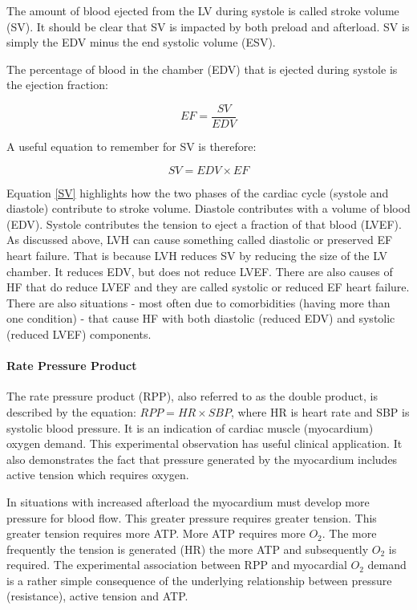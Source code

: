The amount of blood ejected from the LV during systole is called stroke volume (SV). It should be clear that SV is impacted by both preload and afterload. SV is simply the EDV minus the end systolic volume (ESV). 

The percentage of blood in the chamber (EDV) that is ejected during systole is the ejection fraction: 

\begin{equation}
    EF = \frac{SV}{EDV}
    \label{LVEF}
\end{equation}

A useful equation to remember for SV is therefore:

\begin{equation}
    SV = EDV \times EF
    \label{SV}
\end{equation}

Equation \ref{SV} highlights how the two phases of the cardiac cycle (systole and diastole) contribute to stroke volume. Diastole contributes with a volume of blood (EDV). Systole contributes the tension to eject a fraction of that blood (LVEF). As discussed above, LVH can cause something called diastolic or preserved EF heart failure. That is because LVH reduces SV by reducing the size of the LV chamber. It reduces EDV, but does not reduce LVEF. There are also causes of HF that do reduce LVEF and they are called systolic or reduced EF heart failure. There are also situations - most often due to comorbidities (having more than one condition) - that cause HF with both diastolic (reduced EDV) and systolic (reduced LVEF) components. 

\paragraph{Rate Pressure Product}

The rate pressure product (RPP), also referred to as the double product, is described by the equation: $RPP = HR \times SBP$, where HR is heart rate and SBP is systolic blood pressure. It is an indication of cardiac muscle (myocardium) oxygen demand. This experimental observation has useful clinical application. It also demonstrates the fact that pressure generated by the myocardium includes active tension which requires oxygen.

In situations with increased afterload the myocardium must develop more pressure for blood flow. This greater pressure requires greater tension. This greater tension requires more ATP. More ATP requires more $O_2$. The more frequently the tension is generated (HR) the more ATP and subsequently $O_2$ is required. The experimental association between RPP and myocardial $O_2$ demand is a rather simple consequence of the underlying relationship between pressure (resistance), active tension and ATP.


